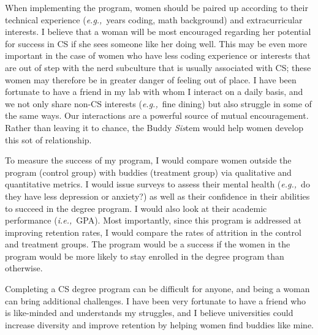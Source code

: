 \documentclass{article}
\newcommand{\ie}{{\em i.e.,}~}
\newcommand{\eg}{{\em e.g.,}~}
\begin{document}
When implementing the program, women should be paired up according to their technical experience (\eg years coding, math background) and extracurricular interests.
I believe that a woman will be most encouraged regarding her potential for success in CS if she sees someone like her doing well.
This may be even more important in the case of women who have less coding experience or interests that are out of step with the nerd subculture that is usually associated with CS; these women may therefore be in greater danger of feeling out of place.
I have been fortunate to have a friend in my lab with whom I interact on a daily basis, and we not only share non-CS interests (\eg fine dining) but also struggle in some of the same ways.
Our interactions are a powerful source of mutual encouragement.
Rather than leaving it to chance, the Buddy \textit{Sis}tem would help women develop this sot of relationship.

To measure the success of my program, I would compare women outside the program (control group) with buddies (treatment group) via qualitative and quantitative metrics.
I would issue surveys to assess their mental health (\eg do they have less depression or anxiety?) as well as their confidence in their abilities to succeed in the degree program.
I would also look at their academic performance (\ie GPA).
Most importantly, since this program is addressed at improving retention rates, I would compare the rates of attrition in the control and treatment groups.
The program would be a success if the women in the program would be more likely to stay enrolled in the degree program than otherwise.

Completing a CS degree program can be difficult for anyone, and being a woman can bring additional challenges.
I have been very fortunate to have a friend who is like-minded and understands my struggles, and I believe universities could increase diversity and improve retention by helping women find buddies like mine.
\end{document}
